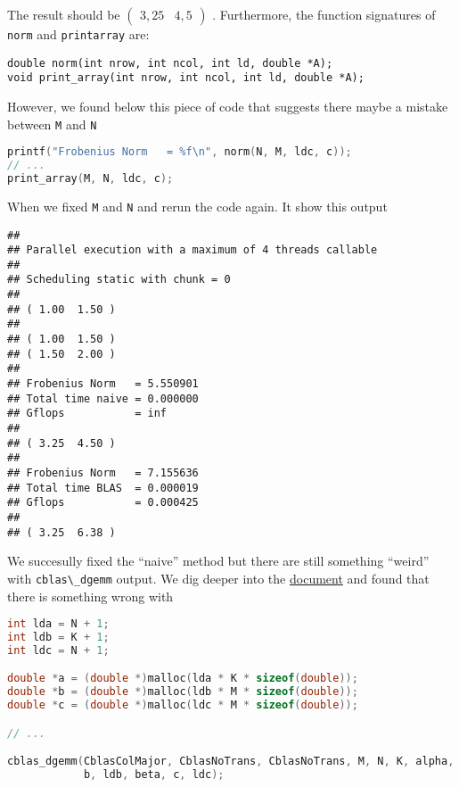 \documentclass[
  12pt,
  xcolor = usenames,dvipsnames]{article}
\newcommand{\passthrough}[1]{#1}
\begin{document}
The result should be
\(\begin{pmatrix}3,25 & 4,5\end{pmatrix}\)
. Furthermore, the function signatures of \passthrough{\lstinline!norm!} and \passthrough{\lstinline!printarray!} are:

\begin{lstlisting}
double norm(int nrow, int ncol, int ld, double *A);
void print_array(int nrow, int ncol, int ld, double *A);
\end{lstlisting}

However, we found below this piece of code that suggests there maybe a mistake between \passthrough{\lstinline!M!} and \passthrough{\lstinline!N!}

\begin{lstlisting}[language=C]
printf("Frobenius Norm   = %f\n", norm(N, M, ldc, c));
// ...
print_array(M, N, ldc, c);
\end{lstlisting}

When we fixed \passthrough{\lstinline!M!} and \passthrough{\lstinline!N!} and rerun the code again. It show this output

\begin{lstlisting}
## 
## Parallel execution with a maximum of 4 threads callable
## 
## Scheduling static with chunk = 0
## 
## ( 1.00  1.50 )
## 
## ( 1.00  1.50 )
## ( 1.50  2.00 )
## 
## Frobenius Norm   = 5.550901
## Total time naive = 0.000000
## Gflops           = inf
## 
## ( 3.25  4.50 )
## 
## Frobenius Norm   = 7.155636
## Total time BLAS  = 0.000019
## Gflops           = 0.000425
## 
## ( 3.25  6.38 )
\end{lstlisting}

We succesully fixed the ``naive'' method but there are still something ``weird'' with \passthrough{\lstinline!cblas\_dgemm!} output. We dig deeper into the \href{https://www.intel.com/content/www/us/en/develop/documentation/onemkl-developer-reference-c/top/blas-and-sparse-blas-routines/blas-routines/blas-level-3-routines/cblas-gemm.html}{document} and found that there is something wrong with

\begin{lstlisting}[language=C]
int lda = N + 1;
int ldb = K + 1;
int ldc = N + 1;

double *a = (double *)malloc(lda * K * sizeof(double));
double *b = (double *)malloc(ldb * M * sizeof(double));
double *c = (double *)malloc(ldc * M * sizeof(double));

// ...

cblas_dgemm(CblasColMajor, CblasNoTrans, CblasNoTrans, M, N, K, alpha, a, lda,
            b, ldb, beta, c, ldc);
\end{lstlisting}
\end{document}
